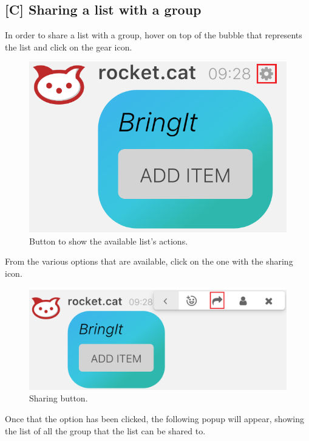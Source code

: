 \newpage
\subsection{[C] Sharing a list with a group}
In order to share a list with a group, hover on top of the bubble that represents the list and click on the gear icon.

\begin{figure}[H]
  \centering 
  \includegraphics[scale=0.3]{Sections/3-HowToUse/Images/list_gear_icon.png}
  \caption{Button to show the available list's actions.}
\end{figure}

From the various options that are available, click on the one with the sharing icon.

\begin{figure}[H]
  \centering 
  \includegraphics[scale=0.3]{Sections/3-HowToUse/Images/list_share_icon.png}
  \caption{Sharing button.}
\end{figure}

Once that the option has been clicked, the following popup will appear, showing the list of all the group that the list can be shared to.

